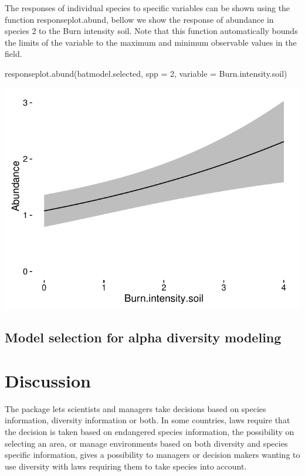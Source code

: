 \documentclass[article]{jss}
\begin{document}
The responses of individual species to specific variables can be shown
using the function responseplot.abund, bellow we show the response of
abundance in species 2 to the Burn intensity soil. Note that this
function automatically bounds the limits of the variable to the maximum
and minimum observable values in the field.

\begin{CodeChunk}
\begin{CodeInput}
responseplot.abund(batmodel.selected, spp = 2, variable = Burn.intensity.soil)
\end{CodeInput}


\begin{center}\includegraphics{diversityocc_files/figure-latex/unnamed-chunk-16-1} \end{center}

\end{CodeChunk}

\subsection{Model selection for alpha diversity
modeling}\label{model-selection-for-alpha-diversity-modeling}

\section{Discussion}\label{discussion}

The  package lets scientists and managers take
decisions based on species information, diversity information or both.
In some countries, laws require that the decision is taken based on
endangered species information, the possibility on selecting an area, or
manage environments based on both diversity and species specific
information, gives a possibility to managers or decision makers wanting
to use diversity with laws requiring them to take species into account.

\renewcommand\refname{References}

\end{document}
